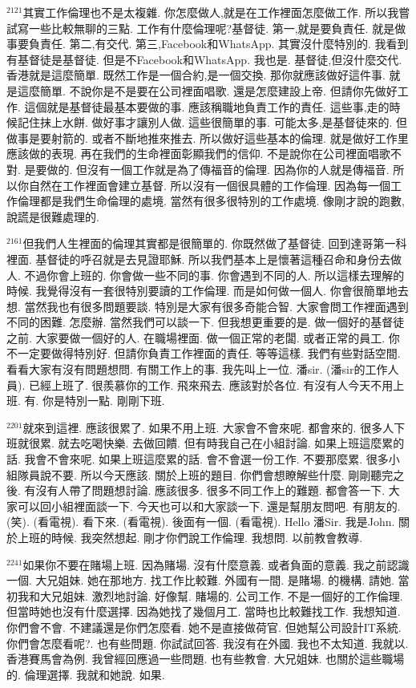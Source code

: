 \documentclass{book}
\begin{document}
$^{2121}$其實工作倫理也不是太複雜.
你怎麼做人,就是在工作裡面怎麼做工作.
所以我嘗試寫一些比較無聊的三點.
工作有什麼倫理呢?基督徒.
第一,就是要負責任.
就是做事要負責任.
第二,有交代.
第三,Facebook和WhatsApp.
其實沒什麼特別的.
我看到有基督徒是基督徒.
但是不Facebook和WhatsApp.
我也是.
基督徒,但沒什麼交代.
香港就是這麼簡單.
既然工作是一個合約,是一個交換.
那你就應該做好這件事.
就是這麼簡單.
不說你是不是要在公司裡面唱歌.
還是怎麼建設上帝.
但請你先做好工作.
這個就是基督徒最基本要做的事.
應該稱職地負責工作的責任.
這些事,走的時候記住抹上水餅.
做好事才讓別人做.
這些很簡單的事.
可能太多,是基督徒來的.
但做事是要射箭的.
或者不斷地推來推去.
所以做好這些基本的倫理.
就是做好工作里應該做的表現.
再在我們的生命裡面彰顯我們的信仰.
不是說你在公司裡面唱歌不對.
是要做的.
但沒有一個工作就是為了傳福音的倫理.
因為你的人就是傳福音.
所以你自然在工作裡面會建立基督.
所以沒有一個很具體的工作倫理.
因為每一個工作倫理都是我們生命倫理的處境.
當然有很多很特別的工作處境.
像剛才說的跑數,說謊是很難處理的.

$^{2161}$但我們人生裡面的倫理其實都是很簡單的.
你既然做了基督徒.
回到達哥第一科裡面.
基督徒的呼召就是去見證耶穌.
所以我們基本上是懷著這種召命和身份去做人.
不過你會上班的.
你會做一些不同的事.
你會遇到不同的人.
所以這樣去理解的時候.
我覺得沒有一套很特別要讀的工作倫理.
而是如何做一個人.
你會很簡單地去想.
當然我也有很多問題要談.
特別是大家有很多奇能合智.
大家會問工作裡面遇到不同的困難.
怎麼辦.
當然我們可以談一下.
但我想更重要的是.
做一個好的基督徒之前.
大家要做一個好的人.
在職場裡面.
做一個正常的老闆.
或者正常的員工.
你不一定要做得特別好.
但請你負責工作裡面的責任.
等等這樣.
我們有些對話空間.
看看大家有沒有問題想問.
有關工作上的事.
我先叫上一位.
潘sir.
(潘sir的工作人員).
已經上班了.
很羨慕你的工作.
飛來飛去.
應該對於各位.
有沒有人今天不用上班.
有.
你是特別一點.
剛剛下班.

$^{2201}$就來到這裡.
應該很累了.
如果不用上班.
大家會不會來呢.
都會來的.
很多人下班就很累.
就去吃喝快樂.
去做回饋.
但有時我自己在小組討論.
如果上班這麼累的話.
我會不會來呢.
如果上班這麼累的話.
會不會選一份工作.
不要那麼累.
很多小組隊員說不要.
所以今天應該.
關於上班的題目.
你們會想瞭解些什麼.
剛剛聽完之後.
有沒有人帶了問題想討論.
應該很多.
很多不同工作上的難題.
都會答一下.
大家可以回小組裡面談一下.
今天也可以和大家談一下.
還是幫朋友問吧.
有朋友的.
(笑).
(看電視).
看下來.
(看電視).
後面有一個.
(看電視).
Hello 潘Sir.
我是John.
關於上班的時候.
我突然想起.
剛才你們說工作倫理.
我想問.
以前教會教導.

$^{2241}$如果你不要在賭場上班.
因為賭場.
沒有什麼意義.
或者負面的意義.
我之前認識一個.
大兄姐妹.
她在那地方.
找工作比較難.
外國有一間.
是賭場.
的機構.
請她.
當初我和大兄姐妹.
激烈地討論.
好像幫.
賭場的.
公司工作.
不是一個好的工作倫理.
但當時她也沒有什麼選擇.
因為她找了幾個月工.
當時也比較難找工作.
我想知道.
你們會不會.
不建議還是你們怎麼看.
她不是直接做荷官.
但她幫公司設計IT系統.
你們會怎麼看呢?.
也有些問題.
你試試回答.
我沒有在外國.
我也不太知道.
我就以.
香港賽馬會為例.
我曾經回應過一些問題.
也有些教會.
大兄姐妹.
也關於這些職場的.
倫理選擇.
我就和她說.
如果.
\end{document}
